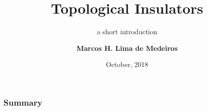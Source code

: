 \documentclass[usenames, dvipsnames]{beamer}
\title[introduction to topological insulators] %
{Topological Insulators}
\subtitle{a short introduction}
\author{\textbf {Marcos H. Lima de Medeiros}}
\institute[IFUSP] %
{
  Instituto de Física\\
  Universidade de São Paulo
}
\date[VLC 2013] %
{October, 2018}
\begin{document}
\frame{\titlepage}

\begin{frame}
 \frametitle{Summary}
 \tableofcontents[pausesections]
\end{frame}



\end{document}
